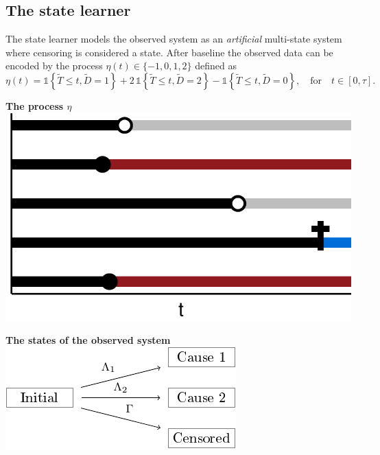 \documentclass[a0,portrait]{a0poster}
\newcommand{\1}{\mathds{1}}
\begin{document}
\begin{minipage}{\textwidth}
\begin{minipage}[t]{1\linewidth}
\begin{multicols}{2}
\section*{The state learner}

The state learner models the observed system as an \textit{artificial}
multi-state system where censoring is considered a state. After baseline the
observed data can be encoded by the process \( \eta(t) \in \{-1, 0, 1,2\} \)
defined as
\begin{equation*}
  \eta(t) = \1{
    \left\{
      \tilde{T} \leq t, \tilde D=1
    \right\}} + 2\,\1{\left\{\tilde{T} \leq t, \tilde
      D=2\right\}} - \1{\left\{\tilde{T} \leq t, \tilde D=0\right\}},
  \quad \text{for} \quad t \in [0, \tau].
\end{equation*}

\begin{minipage}[t]{0.5\linewidth}
  \begin{center}
    \textbf{The process \( \eta \)} \\[1em]
    \includegraphics[width=0.8\linewidth]{multi-state-data-3.pdf}
\end{center}
\end{minipage}
\begin{minipage}[t]{.5\linewidth}
  \begin{center}
    \textbf{The states of the observed system} \\[1em]
    \includegraphics[width=.9\linewidth]{comp-risk-observed-w-text.pdf}
\end{center}
\end{minipage}


\end{multicols}
\end{minipage}
\end{minipage}
\end{document}
